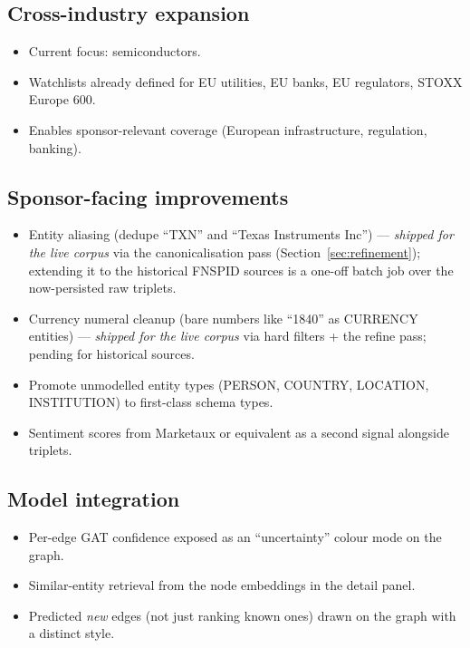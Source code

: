 \documentclass[11pt]{article}
\begin{document}
\subsection{Cross-industry expansion}
\begin{itemize}
  \item Current focus: semiconductors.
  \item Watchlists already defined for EU utilities, EU banks, EU regulators, STOXX Europe 600.
  \item Enables sponsor-relevant coverage (European infrastructure, regulation, banking).
\end{itemize}

\subsection{Sponsor-facing improvements}
\begin{itemize}
  \item Entity aliasing (dedupe ``TXN'' and ``Texas Instruments Inc'') --- \emph{shipped for the live corpus} via the canonicalisation pass (Section~\ref{sec:refinement}); extending it to the historical FNSPID sources is a one-off batch job over the now-persisted raw triplets.
  \item Currency numeral cleanup (bare numbers like ``1840'' as CURRENCY entities) --- \emph{shipped for the live corpus} via hard filters + the refine pass; pending for historical sources.
  \item Promote unmodelled entity types (PERSON, COUNTRY, LOCATION, INSTITUTION) to first-class schema types.
  \item Sentiment scores from Marketaux or equivalent as a second signal alongside triplets.
\end{itemize}

\subsection{Model integration}
\begin{itemize}
  \item Per-edge GAT confidence exposed as an ``uncertainty'' colour mode on the graph.
  \item Similar-entity retrieval from the node embeddings in the detail panel.
  \item Predicted \emph{new} edges (not just ranking known ones) drawn on the graph with a distinct style.
\end{itemize}
\end{document}
